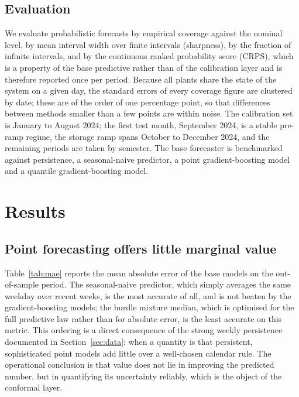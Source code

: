 \documentclass[preprint,3p,times]{elsarticle}
\begin{document}
\subsection{Evaluation}

We evaluate probabilistic forecasts by empirical coverage against the nominal level, by mean interval width over finite intervals (sharpness), by the fraction of infinite intervals, and by the continuous ranked probability score (CRPS), which is a property of the base predictive rather than of the calibration layer and is therefore reported once per period. Because all plants share the state of the system on a given day, the standard errors of every coverage figure are clustered by date; these are of the order of one percentage point, so that differences between methods smaller than a few points are within noise. The calibration set is January to August 2024; the first test month, September 2024, is a stable pre-ramp regime, the storage ramp spans October to December 2024, and the remaining periods are taken by semester. The base forecaster is benchmarked against persistence, a seasonal-naive predictor, a point gradient-boosting model and a quantile gradient-boosting model.

\section{Results}
\label{sec:results}

\subsection{Point forecasting offers little marginal value}

Table~\ref{tab:mae} reports the mean absolute error of the base models on the out-of-sample period. The seasonal-naive predictor, which simply averages the same weekday over recent weeks, is the most accurate of all, and is not beaten by the gradient-boosting models; the hurdle mixture median, which is optimised for the full predictive law rather than for absolute error, is the least accurate on this metric. This ordering is a direct consequence of the strong weekly persistence documented in Section~\ref{sec:data}: when a quantity is that persistent, sophisticated point models add little over a well-chosen calendar rule. The operational conclusion is that value does not lie in improving the predicted number, but in quantifying its uncertainty reliably, which is the object of the conformal layer.
\end{document}
